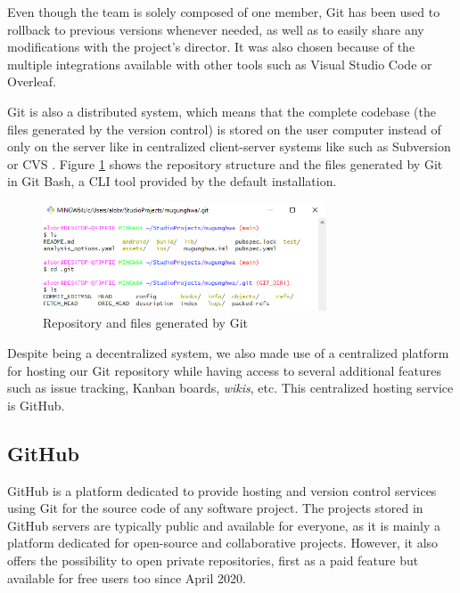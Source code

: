 Even though the team is solely composed of one member, Git has been used to rollback to previous versions whenever needed, as well as to easily share any modifications with the project's director. It was also chosen because of the multiple integrations available with other tools such as Visual Studio Code or Overleaf. 

Git is also a distributed system, which means that the complete codebase (the files generated by the version control) is stored on the user computer instead of only on the server like in centralized client-server systems like such as Subversion \cite{noauthor_apache_nodate} or CVS \cite{noauthor_cvs_nodate}. Figure \ref{fig:git-repo} shows the repository structure and the files generated by Git in Git Bash, a CLI tool provided by the default installation.

\begin{figure}[h]
  \centering
  \includegraphics[width=0.75\textwidth]{Figures/git-repo.png}
  \caption{%
    Repository and files generated by Git
  }
  \label{fig:git-repo}
\end{figure}

Despite being a decentralized system, we also made use of a centralized platform for hosting our Git repository while having access to several additional features such as issue tracking, Kanban boards, \textit{wikis}, etc. This centralized hosting service is GitHub.

\subsection{GitHub}

GitHub \cite{noauthor_githubcom_2021} is a platform dedicated to provide hosting and version control services using Git for the source code of any software project. The projects stored in GitHub servers are typically public and available for everyone, as it is mainly a platform dedicated for open-source and collaborative projects. However, it also offers the possibility to open private repositories, first as a paid feature but available for free users too since April 2020. 


